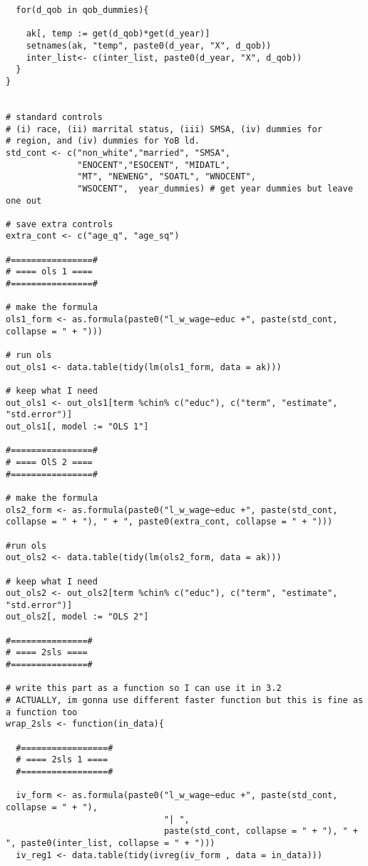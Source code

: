 \documentclass[12pt]{article}
\begin{document}
\begin{verbatim}
  for(d_qob in qob_dummies){
    
    ak[, temp := get(d_qob)*get(d_year)]
    setnames(ak, "temp", paste0(d_year, "X", d_qob))
    inter_list<- c(inter_list, paste0(d_year, "X", d_qob))
  }
}


# standard controls 
# (i) race, (ii) marrital status, (iii) SMSA, (iv) dummies for
# region, and (iv) dummies for YoB ld.
std_cont <- c("non_white","married", "SMSA", 
              "ENOCENT","ESOCENT", "MIDATL", 
              "MT", "NEWENG", "SOATL", "WNOCENT",
              "WSOCENT",  year_dummies) # get year dummies but leave one out 

# save extra controls 
extra_cont <- c("age_q", "age_sq")

#================#
# ==== ols 1 ====
#================#

# make the formula 
ols1_form <- as.formula(paste0("l_w_wage~educ +", paste(std_cont, collapse = " + ")))

# run ols 
out_ols1 <- data.table(tidy(lm(ols1_form, data = ak)))

# keep what I need 
out_ols1 <- out_ols1[term %chin% c("educ"), c("term", "estimate", "std.error")]
out_ols1[, model := "OLS 1"]

#================#
# ==== OlS 2 ====
#================#

# make the formula 
ols2_form <- as.formula(paste0("l_w_wage~educ +", paste(std_cont, collapse = " + "), " + ", paste0(extra_cont, collapse = " + ")))

#run ols
out_ols2 <- data.table(tidy(lm(ols2_form, data = ak)))

# keep what I need 
out_ols2 <- out_ols2[term %chin% c("educ"), c("term", "estimate", "std.error")]
out_ols2[, model := "OLS 2"]

#===============#
# ==== 2sls ====
#===============#

# write this part as a function so I can use it in 3.2 
# ACTUALLY, im gonna use different faster function but this is fine as a function too
wrap_2sls <- function(in_data){
  
  #=================#
  # ==== 2sls 1 ====
  #=================#
  
  iv_form <- as.formula(paste0("l_w_wage~educ +", paste(std_cont, collapse = " + "), 
                               "| ", 
                               paste(std_cont, collapse = " + "), " + ", paste0(inter_list, collapse = " + ")))
  iv_reg1 <- data.table(tidy(ivreg(iv_form , data = in_data)))
  

\end{verbatim}
\end{document}
